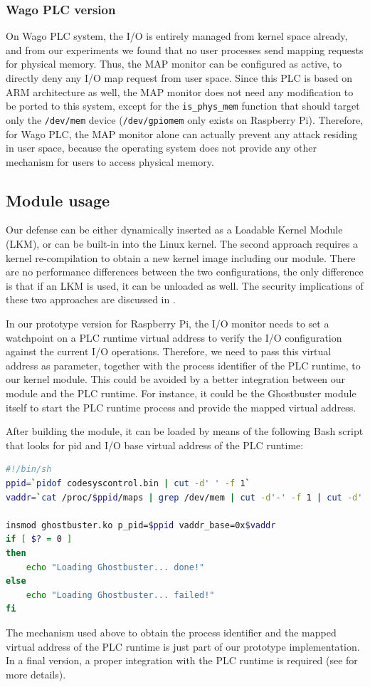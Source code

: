\subsubsection{Wago PLC version}

On Wago PLC system, the I/O is entirely managed from kernel space already, and from our experiments we found that no user processes send mapping requests for physical memory.
Thus, the MAP monitor can be configured as active, to directly deny any I/O map request from user space.
Since this PLC is based on ARM architecture as well, the MAP monitor does not need any modification to be ported to this system,
except for the \verb|is_phys_mem| function that should target only the \verb|/dev/mem| device (\verb|/dev/gpiomem| only exists on Raspberry Pi).
Therefore, for Wago PLC, the MAP monitor alone can actually prevent any attack residing in user space, because the operating system does not provide
any other mechanism for users to access physical memory.


\subsection{Module usage}
\label{sec:def-usage}

Our defense can be either dynamically inserted as a Loadable Kernel Module (LKM), or can be built-in into the Linux kernel.
The second approach requires a kernel re-compilation to obtain a new kernel image including our module.
There are no performance differences between the two configurations, the only difference is that if an LKM is used, it can be unloaded as well.
The security implications of these two approaches are discussed in .

In our prototype version for Raspberry Pi, the I/O monitor needs to set a watchpoint on a PLC runtime virtual address to verify the I/O configuration
against the current I/O operations. Therefore, we need to pass this virtual address as parameter, together with the process identifier of the PLC runtime, to our kernel module.
This could be avoided by a better integration between our module and the PLC runtime.
For instance, it could be the Ghostbuster module itself to start the PLC runtime process and provide the mapped virtual address.

After building the module, it can be loaded by means of the following Bash script that looks for pid and I/O base virtual address of the PLC runtime:
\begin{lstlisting}[language=bash]
#!/bin/sh
ppid=`pidof codesyscontrol.bin | cut -d' ' -f 1`
vaddr=`cat /proc/$ppid/maps | grep /dev/mem | cut -d'-' -f 1 | cut -d' ' -f 1`

insmod ghostbuster.ko p_pid=$ppid vaddr_base=0x$vaddr
if [ $? = 0 ]
then
	echo "Loading Ghostbuster... done!"
else
	echo "Loading Ghostbuster... failed!"
fi
\end{lstlisting}
The mechanism used above to obtain the process identifier and the mapped virtual address of the PLC runtime is just part of our prototype implementation.
In a final version, a proper integration with the PLC runtime is required (see  for more details).

